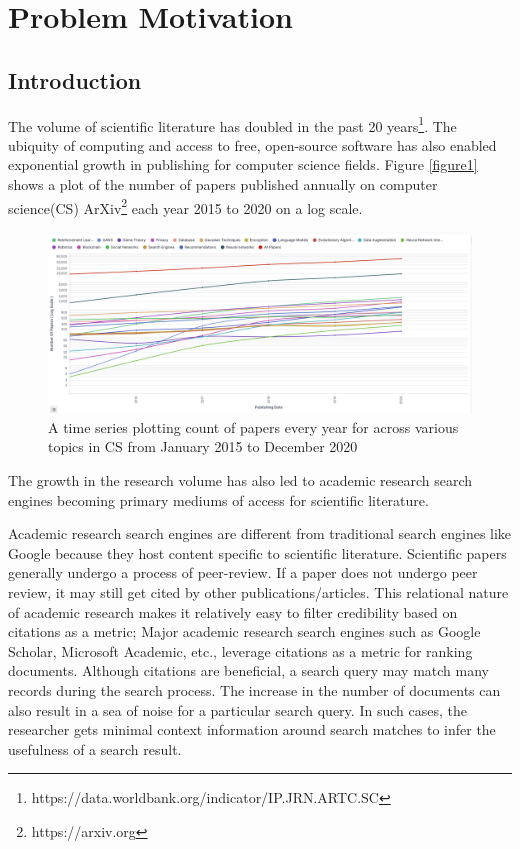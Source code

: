 \chapter{Problem Motivation}

\section{Introduction}    

The volume of scientific literature has doubled in the past 20 years\footnote{https://data.worldbank.org/indicator/IP.JRN.ARTC.SC}.  
The ubiquity of computing and access to free, open-source software has also enabled exponential growth in publishing for computer science fields.  
Figure \ref{figure1} shows a plot of the number of papers published annually on computer science(CS) ArXiv\footnote{https://arxiv.org} each year 2015 to 2020 on a log scale. 

\begin{figure}[h]
    \centering
    \includegraphics[width=\maxwidth{\textwidth}]{src/images/num-papers.pdf}
    \caption{ A time series plotting count of papers every year for across various topics in CS from January 2015 to December 2020}
    \label{figure\arabic{figurecounter}}
\end{figure}

The growth in the research volume has also led to academic research search engines becoming primary mediums of access for scientific literature. 

Academic research search engines are different from traditional search engines like Google because they host content specific to scientific literature. 
Scientific papers generally undergo a process of peer-review. If a paper does not undergo peer review, it may still get cited by other publications/articles. This relational nature of academic research makes it relatively easy to filter credibility based on citations as a metric; Major academic research search engines such as Google Scholar, Microsoft Academic, etc., leverage citations as a metric for ranking documents. Although citations are beneficial, a search query may match many records during the search process. The increase in the number of documents can also result in a sea of noise for a particular search query. In such cases, the researcher gets minimal context information around search matches to infer the usefulness of a search result. 

